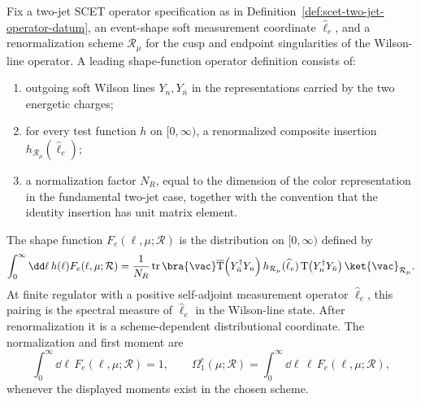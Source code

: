 \begin{definition}
\label{def:leading-shape-function-operator-datum}
Fix a two-jet SCET operator specification as in
Definition~\ref{def:scet-two-jet-operator-datum}, an event-shape soft
measurement coordinate \(\widehat\ell_e\), and a renormalization scheme
\(\mathcal R_\mu\) for the cusp and endpoint singularities of the Wilson-line
operator.  A leading shape-function operator definition consists of:
\begin{enumerate}
  \item outgoing soft Wilson lines \(Y_n,Y_{\bar n}\) in the representations
  carried by the two energetic charges;
  \item for every test function \(h\) on \([0,\infty)\), a renormalized
  composite insertion \(h_{\mathcal R_\mu}(\widehat\ell_e)\);
  \item a normalization factor \(N_R\), equal to the dimension of the color
  representation in the fundamental two-jet case, together with the convention
  that the identity insertion has unit matrix element.
\end{enumerate}
The shape function \(F_e(\ell,\mu;\mathcal R)\) is the distribution on
\([0,\infty)\) defined by
\begin{equation}
  \int_0^\infty \dd\ell\, h(\ell)F_e(\ell,\mu;\mathcal R)
  =
  \frac1{N_R}
  \operatorname{tr}
  \bra{\vac}
  \overline{\operatorname T}\!\left(Y_{\bar n}^{\dagger}Y_n\right)
  h_{\mathcal R_\mu}(\widehat\ell_e)
  \operatorname T\!\left(Y_n^{\dagger}Y_{\bar n}\right)
  \ket{\vac}_{\mathcal R_\mu}.
  \label{eq:shape-function-test-pairing}
\end{equation}
At finite regulator with a positive self-adjoint measurement operator
\(\widehat\ell_e\), this pairing is the spectral measure of
\(\widehat\ell_e\) in the Wilson-line state.  After renormalization it is a
scheme-dependent distributional coordinate.  The normalization and first
moment are
\begin{equation}
  \int_0^\infty\dd\ell\,F_e(\ell,\mu;\mathcal R)=1,
  \qquad
  \Omega_1^e(\mu;\mathcal R)
  =
  \int_0^\infty\dd\ell\,\ell\,F_e(\ell,\mu;\mathcal R),
  \label{eq:shape-function-normalization-moment}
\end{equation}
whenever the displayed moments exist in the chosen scheme.
\end{definition}

